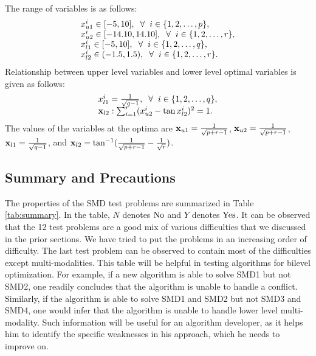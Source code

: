 \documentclass[twoside]{article}
\begin{document}
The range of variables is as follows:
\begin{equation}
\begin{array}{l}
x_{u1}^{i} \in [-5,10], \hspace{2mm} \forall \hspace{2mm} i \in \{1,2,\ldots,p\},\\
x_{u2}^{i} \in [-14.10,14.10], \hspace{2mm} \forall \hspace{2mm} i \in \{1,2,\ldots,r\},\\
x_{l1}^{i} \in [-5,10], \hspace{2mm} \forall \hspace{2mm} i \in \{1,2,\ldots,q\},\\
x_{l2}^{i} \in (-1.5,1.5), \hspace{2mm} \forall \hspace{2mm} i \in \{1,2,\ldots,r\}.
\end{array}
\end{equation}
Relationship between upper level variables and lower level optimal variables is given as follows:
\begin{equation}
\begin{array}{l}
x_{l1}^{i} = \frac{1}{\sqrt{q-1}}, \hspace{2mm} \forall \hspace{2mm} i \in \{1,2,\ldots,q\},\\
\mbox{$\mathbf{x}$}_{l2} : \sum_{i=1}^{r} (x_{u2}^{i} - \tan x_{l2}^{i})^2 = 1.
\end{array}
\end{equation}
The values of the variables at the optima are $\mbox{$\mathbf{x}$}_{u1}=\frac{1}{\sqrt{p+r-1}}$, $\mbox{$\mathbf{x}$}_{u2}=\frac{1}{\sqrt{p+r-1}}$, $\mbox{$\mathbf{x}$}_{l1}=\frac{1}{\sqrt{q-1}}$, and $\mbox{$\mathbf{x}$}_{l2}=\tan^{-1}(\frac{1}{\sqrt{p+r-1}}-\frac{1}{\sqrt{r}})$. 

\subsection{Summary and Precautions}
The properties of the SMD test problems are summarized in Table \ref{tab:summary}. In the table, $N$ denotes ${\rm No}$ and $Y$ denotes ${\rm Yes}$. It can be observed that the 12 test problems are a good mix of various difficulties that we discussed in the prior sections. We have tried to put the problems in an increasing order of difficulty. The last test problem can be observed to contain most of the difficulties except multi-modalities. This table will be helpful in testing algorithms for bilevel optimization. For example, if a new algorithm is able to solve SMD1 but not SMD2, one readily concludes that the algorithm is unable to handle a conflict. Similarly, if the algorithm is able to solve SMD1 and SMD2 but not SMD3 and SMD4, one would infer that the algorithm is unable to handle lower level multi-modality. Such information will be useful for an algorithm developer, as it helps him to identify the specific weaknesses in his approach, which he needs to improve on.
\end{document}
